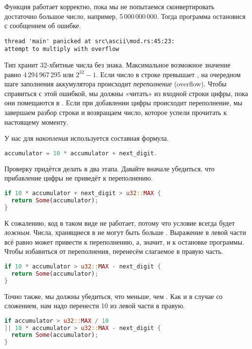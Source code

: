 Функция работает корректно, пока мы не попытаемся сконвертировать достаточно большое число, например, 5\,000\,000\,000.
Тогда программа остановися с сообщением об ошибке.

\begin{lstlisting}
thread 'main' panicked at src\ascii\mod.rs:45:23:
attempt to multiply with overflow
\end{lstlisting}

Тип  хранит 32-хбитные числа без знака.
Максимальное возможное значение  равно 4\,294\,967\,295 или $2^32-1$.
Если число в строке превышает , на очередном шаге заполнения аккумулятора происходит {\em переполнение} (overflow).
Чтобы справиться с этой ошибкой, мы должны «читать» из входной строки цифры, пока они помещаются в .
Если при добавлении цифры происходит переполнение, мы завершаем разбор строки и возвращаем число, которое успели прочитать к настоящему моменту.

У нас для {\em накопления} используется составная формула.

\begin{lstlisting}[language=Rust]
accumulator = 10 * accumulator + next_digit.
\end{lstlisting}

Проверку придётся делать в два этапа. Давайте вначале убедиться, что прибавление цифры не приведёт к переполнению.

\begin{lstlisting}[language=Rust]
if 10 * accumulator + next_digit > u32::MAX {
  return Some(accumulator);
}
\end{lstlisting}

К сожалению, код в таком виде не работает, потому что условие всегда будет {\em ложным}.
Числа, хранящиеся в  не могут быть больше .
Выражение в левой части всё равно может привести к переполнению, а, значит, и к остановке программы.
Чтобы избавиться от переполнения, перенесём слагаемое  в правую часть.

\begin{lstlisting}[language=Rust]
if 10 * accumulator > u32::MAX - next_digit {
  return Some(accumulator);
}
\end{lstlisting}

Точно также, мы должны убедиться, что  меньше, чем .
Как и в случае со сложением, нам надо перенести 10 из левой части в правую.

\begin{lstlisting}[language=Rust]
if accumulator > u32::MAX / 10
|| 10 * accumulator > u32::MAX - next_digit {
  return Some(accumulator);
}
\end{lstlisting}

